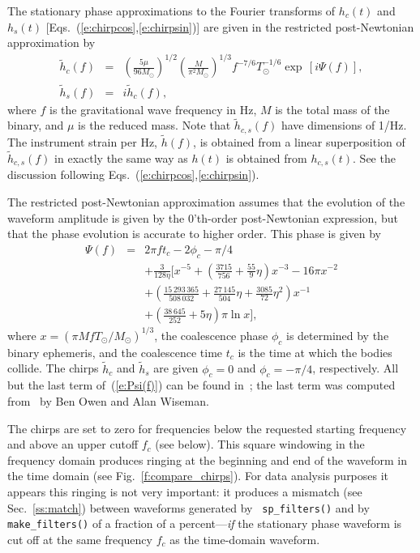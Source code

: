 The stationary phase approximations to the Fourier transforms
of $h_c(t)$ and $h_s(t)$
[Eqs.~(\ref{e:chirpcos},\ref{e:chirpsin})]
are given in the restricted post-Newtonian approximation by
\begin{eqnarray}
\label{e:chirpcosfreq}
\tilde{h}_c(f)&=&\left(\frac{5\mu}{96M_\odot}\right)^{1/2}
\left(\frac{M}{\pi^2M_\odot}\right)^{1/3}f^{-7/6}T_\odot^{-1/6}
\exp\,[i\Psi(f)],\\
\label{e:chirpsinfreq}
\tilde{h}_s(f)&=&i\tilde{h}_c(f),
\end{eqnarray}
where $f$ is the gravitational wave frequency in Hz, $M$ is the total
mass of the binary, and $\mu$ is the reduced mass.  Note that
$\tilde{h}_{c,s}(f)$ have dimensions of 1/Hz.  The instrument strain
per Hz, $\tilde{h}(f)$, is obtained from a linear superposition of
$\tilde{h}_{c,s}(f)$ in exactly the same way as $h(t)$ is obtained from
$h_{c,s}(t)$.  See the discussion following
Eqs.~(\ref{e:chirpcos},\ref{e:chirpsin}).

The restricted post-Newtonian approximation assumes that the evolution
of the waveform amplitude is given by the 0'th-order post-Newtonian
expression, but that the phase evolution is accurate to higher order.
This phase is given by
\begin{eqnarray}
\label{e:Psi(f)}
\Psi(f)&=&2\pi ft_c-2\phi_c-\pi/4\nonumber\\
&&+\frac{3}{128\eta}\biggl[x^{-5}+
\left(\frac{3715}{756}+\frac{55}{9}\eta\right)x^{-3}
-16\pi x^{-2}\nonumber\\
&&+\left(\frac{15\,293\,365}{508\,032}+\frac{27\,145}{504}\eta
+\frac{3085}{72}\eta^2\right)x^{-1}\nonumber\\
&&+\left(\frac{38\,645}{252}+5\eta\right)\pi\ln{x}\biggr],
\end{eqnarray}
where $x=(\pi MfT_\odot/M_\odot)^{1/3}$, the coalescence phase
$\phi_c$ is determined by the binary ephemeris, and the coalescence
time $t_c$ is the time at which the bodies collide.  The chirps
$\tilde{h}_c$ and $\tilde{h}_s$ are given $\phi_c=0$ and
$\phi_c=-\pi/4$, respectively.  All but the last term
of~(\ref{e:Psi(f)}) can be found in~\cite{poisson:1995}; the last term
was computed from~\cite{blanchet:1996} by Ben Owen and Alan Wiseman.

The chirps are set to zero for frequencies below the requested
starting frequency and above an upper cutoff $f_c$ (see below).  This
square windowing in the frequency domain produces ringing at the
beginning and end of the waveform in the time domain (see
Fig.~\ref{f:compare_chirps}).  For data analysis purposes it appears
this ringing is not very important: it produces a mismatch (see
Sec.~\ref{ss:match}) between waveforms generated by {\tt
  sp\_filters()} and by {\tt make\_filters()} of a fraction of a
percent---{\em if} the stationary phase waveform is cut off at the
same frequency $f_c$ as the time-domain waveform.

